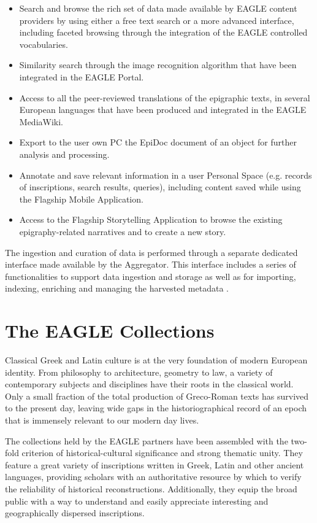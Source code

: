 \documentclass[amsthm,ebook]{saparticle}
\begin{document}
\begin{itemize}
\item Search and browse the rich set of data made available by EAGLE content providers by using either a free text
search or a more advanced interface, including faceted browsing through the integration of the EAGLE controlled
vocabularies.
\item Similarity search through the image recognition algorithm that have been integrated in the EAGLE Portal.
\item Access to all the peer-reviewed translations of the epigraphic texts, in several European languages that have been
produced and integrated in the EAGLE MediaWiki.
\item Export to the user own PC the EpiDoc document of an object for further analysis and processing.
\item Annotate and save relevant information in a user Personal Space (e.g. records of inscriptions, search results,
queries), including content saved while using the Flagship Mobile Application.
\item Access to the Flagship Storytelling Application to browse the existing epigraphy-related narratives and to create
a new story.
\end{itemize}
The ingestion and curation of data is performed through a separate dedicated interface made available by the Aggregator.
This interface includes a series of functionalities to support data ingestion and storage as well as for importing,
indexing, enriching and managing the harvested metadata \citep{amato_second_2015}.

\section{The EAGLE Collections}

\noindent Classical Greek and Latin culture is at the very foundation of modern European identity. From philosophy to
architecture, geometry to law, a variety of contemporary subjects and disciplines have their roots in the classical
world. Only a small fraction of the total production of Greco-Roman texts has survived to the present day, leaving wide
gaps in the historiographical record of an epoch that is immensely relevant to our modern day lives. 

The collections held by the EAGLE partners have been assembled with the two-fold criterion of historical-cultural
significance and strong thematic unity. They feature a great variety of inscriptions written in Greek, Latin and other
ancient languages, providing scholars with an authoritative resource by which to verify the reliability of historical
reconstructions. Additionally, they equip the broad public with a way to understand and easily appreciate interesting
and geographically dispersed inscriptions.
\end{document}

